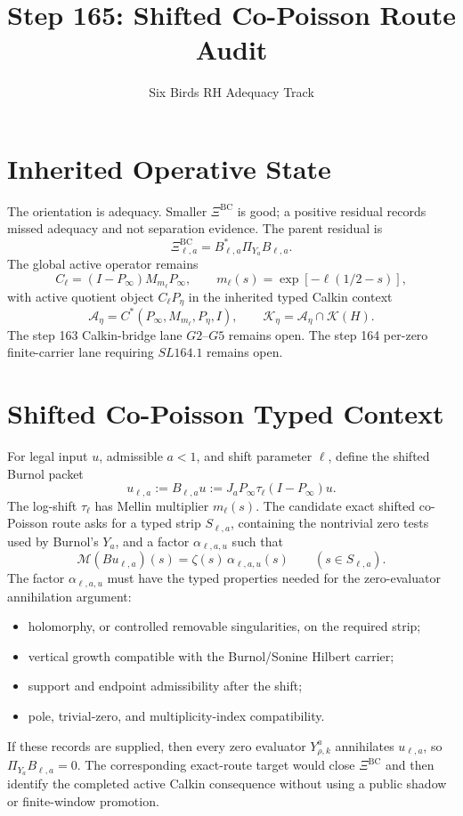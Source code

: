 \documentclass[11pt]{article}
\title{Step 165: Shifted Co-Poisson Route Audit}
\author{Six Birds RH Adequacy Track}
\date{}
\newcommand{\XiBC}{\Xi^{\mathrm{BC}}}
\newcommand{\Cell}{C_{\ell}}
\newcommand{\Peta}{P_{\eta}}
\newcommand{\Pinfty}{P_{\infty}}
\newcommand{\cA}{\mathcal A}
\newcommand{\cK}{\mathcal K}
\newcommand{\Mell}{\mathcal M}
\newcommand{\zetaF}{\zeta}
\begin{document}
\maketitle

\section*{Inherited Operative State}

The orientation is adequacy. Smaller \(\XiBC\) is good; a positive residual
records missed adequacy and not separation evidence. The parent residual is
\[
  \XiBC_{\ell,a}=B_{\ell,a}^*\Pi_{Y_a}B_{\ell,a}.
\]
The global active operator remains
\[
  \Cell=(I-\Pinfty)M_{m_\ell}\Pinfty,\qquad
  m_\ell(s)=\exp[-\ell(1/2-s)],
\]
with active quotient object \(\Cell\Peta\) in the inherited typed Calkin
context
\[
  \cA_\eta=C^*(\Pinfty,M_{m_\ell},\Peta,I),\qquad
  \cK_\eta=\cA_\eta\cap\cK(H).
\]
The step 163 Calkin-bridge lane \(G2\)--\(G5\) remains open. The step 164
per-zero finite-carrier lane requiring \(SL164.1\) remains open.

\section*{Shifted Co-Poisson Typed Context}

For legal input \(u\), admissible \(a<1\), and shift parameter \(\ell\), define
the shifted Burnol packet
\[
  u_{\ell,a}:=B_{\ell,a}u
  :=
  J_a\Pinfty\tau_\ell(I-\Pinfty)u.
\]
The log-shift \(\tau_\ell\) has Mellin multiplier \(m_\ell(s)\). The candidate
exact shifted co-Poisson route asks for a typed strip \(S_{\ell,a}\), containing
the nontrivial zero tests used by Burnol's \(Y_a\), and a factor
\(\alpha_{\ell,a,u}\) such that
\[
  \Mell(Bu_{\ell,a})(s)
  =
  \zetaF(s)\,\alpha_{\ell,a,u}(s)
  \qquad (s\in S_{\ell,a}).
\]
The factor \(\alpha_{\ell,a,u}\) must have the typed properties needed for the
zero-evaluator annihilation argument:
\begin{itemize}[leftmargin=2em]
\item holomorphy, or controlled removable singularities, on the required strip;
\item vertical growth compatible with the Burnol/Sonine Hilbert carrier;
\item support and endpoint admissibility after the shift;
\item pole, trivial-zero, and multiplicity-index compatibility.
\end{itemize}
If these records are supplied, then every zero evaluator \(Y^a_{\rho,k}\)
annihilates \(u_{\ell,a}\), so \(\Pi_{Y_a}B_{\ell,a}=0\). The corresponding
exact-route target would close \(\XiBC\) and then identify the completed active
Calkin consequence without using a public shadow or finite-window promotion.
\end{document}
